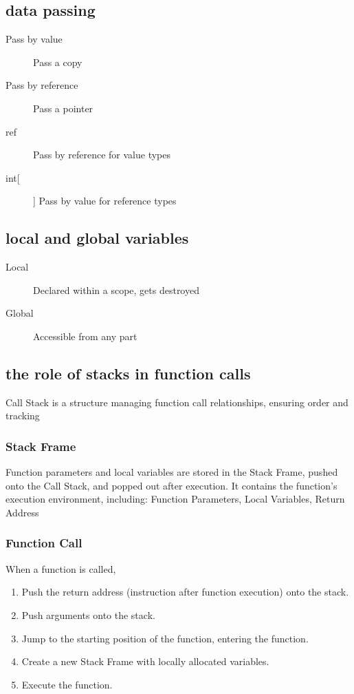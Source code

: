 \documentclass[11pt,journal,compsoc]{IEEEtran}
\begin{document}
\subsection{data passing}

\begin{description}
    \item[Pass by value] Pass a copy
    \item[Pass by reference] Pass a pointer
    \item[ref] Pass by reference for value types 
    \item[int[]] Pass by value for reference types 
\end{description}


\subsection{local and global variables}

\begin{description}
    \item[Local] Declared within a scope, gets destroyed

    \item[Global] Accessible from any part
\end{description}


\subsection{the role of stacks in function calls}

Call Stack is a structure managing function call relationships, ensuring order and tracking


\subsubsection{Stack Frame}

Function parameters and local variables are stored in the Stack Frame, pushed onto the Call Stack, and popped out after execution. It contains the function's execution environment, including: Function Parameters, Local Variables, Return Address


\subsubsection{Function Call}

When a function is called,

\begin{enumerate}
    \item Push the return address (instruction after function execution) onto the stack.
    \item Push arguments onto the stack.
    \item Jump to the starting position of the function, entering the function.
    \item Create a new Stack Frame with locally allocated variables.
    \item Execute the function.
\end{enumerate}
\end{document}
